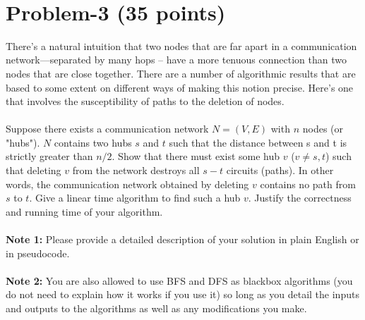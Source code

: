 \documentclass[11pt]{article}
\begin{document}
​
\newpage
\section*{Problem-3 (35 points)}
\noindent
There’s a natural intuition that two nodes that are far apart in a communication network—separated by many hops -- have a more tenuous connection than two nodes that are close together. There are a number of algorithmic results that are based to some extent on different ways of making this notion precise. Here’s one that involves the susceptibility of paths to the deletion of nodes. \\ \\ 
\noindent
Suppose there exists a communication network $N = (V , E)$ with $n$ nodes (or "hubs"). $N$ contains two hubs $s$ and $t$ such that the distance between s and t is strictly greater than $n/2$. Show that there must exist some hub $v$ ($v \neq s, t$) such that deleting $v$ from the network destroys all $s-t$ circuits (paths). In other words, the communication network obtained by deleting $v$ contains no path from $s$ to $t$. Give a linear time algorithm to find such a hub $v$. Justify the correctness and running time of your algorithm.\\ \\\textbf{Note 1:} Please provide a detailed description of your solution in plain English or in pseudocode. \\ \\
\textbf{Note 2:} You are also allowed to use BFS and DFS as blackbox algorithms (you do not need to explain how it works if you use it) so long as you detail the inputs and outputs to the algorithms as well as any modifications you make.​
\end{document}
